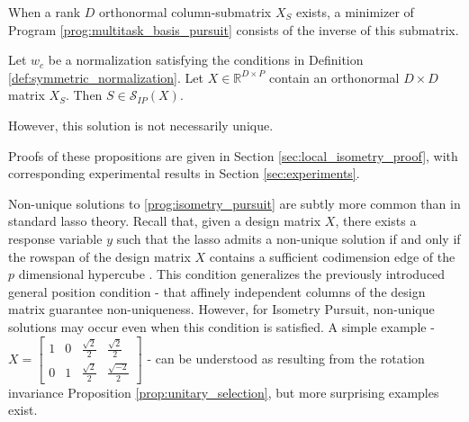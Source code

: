 When a rank $D$ orthonormal column-submatrix $X_{S}$ exists, a minimizer of Program \ref{prog:multitask_basis_pursuit} consists of the inverse of this submatrix.
\begin{proposition}
Let $w_c$ be a normalization satisfying the conditions in Definition \ref{def:symmetric_normalization}.
Let $X \in \mathbb R^{D \times P}$ contain an orthonormal $D \times D$ matrix $X_S$.
Then $S \in \mathcal S_{IP} (X)$.
\label{prop:unitary_selection}
\end{proposition}
However, this solution is not necessarily unique.
\begin{proposition}
\end{proposition}
Proofs of these propositions are given in Section \ref{sec:local_isometry_proof}, with corresponding experimental results in Section \ref{sec:experiments}.

Non-unique solutions to \ref{prog:isometry_pursuit} are subtly more common than in standard lasso theory.
Recall that, given a design matrix $X$, there exists a response variable $y$ such that the lasso admits a non-unique solution if and only if the rowspan of the design matrix $X$ contains a sufficient codimension edge of the $p$ dimensional hypercube \citep{JMLR:v23:21-0420}.
This condition generalizes the previously introduced general position condition - that affinely independent columns of the design matrix guarantee non-uniqueness.
However, for Isometry Pursuit, non-unique solutions may occur even when this condition is satisfied.
A simple example -
$X =
\begin{bmatrix}
1 & 0 & \frac{\sqrt{2}}{2} & \frac{\sqrt{2}}{2}  \\
0 & 1 & \frac{\sqrt{2}}{2} & \frac{\sqrt{-2}}{2}  
\end{bmatrix}$
- can be understood as resulting from the rotation invariance Proposition \ref{prop:unitary_selection}, but more surprising examples exist.
 



